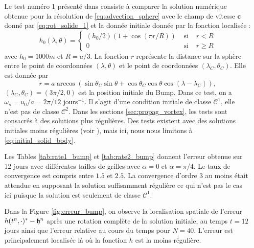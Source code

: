 Le test numéro 1 présenté dans \cite{Williamson1992} consiste à comparer la solution numérique obtenue pour la résolution de \eqref{eq:advection_sphere} avec le champ de vitesse $\mathbf{c}$ donné par \eqref{eq:rot_solide_1} et la donnée initiale donnée par la fonction localisée :
\begin{equation}
h_0(\lambda, \theta) = \left\lbrace
\begin{array}{ccl}
(h_0/2) (1 + \cos (\pi r/R) ) & \text{ si } & r<R \\
0 & \text{ si } & r \geq R
\end{array}
\right.
\label{eq:initial_solid_body}
\end{equation}
avec $h_0 = 1000 \si{m}$ et $R=a/3$. La fonction $r$ représente la distance sur la sphère entre le point de coordonnées $(\lambda, \theta)$ et le point de coordonnées $(\lambda_C, \theta_C)$. Elle est donnée par
\begin{equation}
r = a \arccos \left( \sin \theta_C \sin \theta + \cos \theta_C \cos \theta \cos (\lambda - \lambda_C) \right),
\end{equation}
$(\lambda_C, \theta_C) = (3 \pi / 2 , 0)$ est la position initiale du Bump. Dans ce test, on a $\omega_s = u_0/a = 2 \pi/12$ jours$^{-1}$. Il s'agit d'une condition initiale de classe $\mathcal{C}^1$, elle n'est pas de classe $\mathcal{C}^2$. Dans les sections \ref{sec:propag_vortex}, les tests sont consacrés à des solutions plus régulières. Des tests existent avec des solutions initiales moins régulières (voir \cite{Nair2010}), mais ici, nous nous limitons à \eqref{eq:initial_solid_body}.

Les Tables \ref{tab:rate1_bump} et \ref{tab:rate2_bump} donnent l'erreur obtenue sur 12 jours avec différentes tailles de grilles avec $\alpha=0$ et $\alpha = \pi/4$. Le taux de convergence est compris entre $1.5$ et $2.5$. La convergence d'ordre $3$ au moins était attendue en supposant la solution suffisamment régulière ce qui n'est pas le cas ici puisque la solution est seulement de classe $\mathcal{C}^1$.

Dans la Figure \ref{fig:erreur_bump}, on observe la localisation spatiale de l'erreur $h(t^n, \cdot)^* - \mathfrak{h}^n$ après une rotation complète de la solution initiale, au temps $t=12$ jours ainsi que l'erreur relative au cours du temps pour $N=40$. L'erreur est principalement localisée là où la fonction $h$ est la moins régulière.

